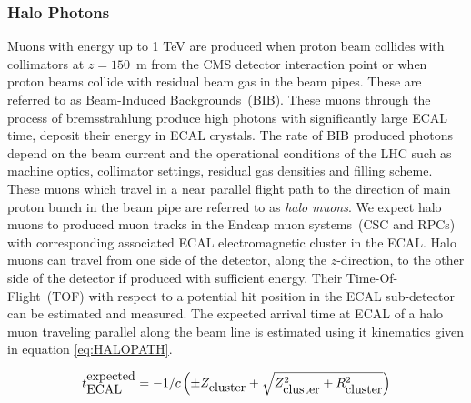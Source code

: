 \subsubsection{Halo Photons}
Muons with energy up to 1 TeV are produced when proton beam collides with collimators at $z = 150$~m from the CMS detector interaction point or when proton beams collide with residual beam gas in the beam pipes. These are referred to as  Beam-Induced Backgrounds~(BIB). These muons through the process of bremsstrahlung produce high \pt photons with significantly large ECAL time, deposit their energy in ECAL crystals. The rate of BIB produced photons depend on the beam current and the operational conditions of the LHC such as machine optics, collimator settings, residual gas densities and filling scheme. These muons which travel in a near parallel flight path to the direction of main proton bunch in the beam pipe are referred to as \textit{halo muons}. We expect halo muons to produced muon tracks in the Endcap muon systems~(CSC and RPCs) with corresponding associated ECAL electromagnetic cluster in the ECAL. Halo muons can travel from one side of the detector, along the $z$-direction, to the other side of the detector if produced with sufficient energy. Their Time-Of-Flight~(TOF) with respect to a potential hit position in the ECAL sub-detector can be estimated and measured.
The expected arrival time at ECAL of a halo muon traveling parallel along the beam line is estimated using it kinematics given in equation \ref{eq:HALOPATH}.

\begin{equation}{\label{eq:HALOPATH}}
t^{\mbox{expected}}_{\mbox{ECAL}} = -1/c\left( \pm Z_{\mbox{cluster}} + \sqrt{Z^{2}_{\mbox{cluster}} + R^{2}_{\mbox{cluster}}}  \right)
\end{equation}

